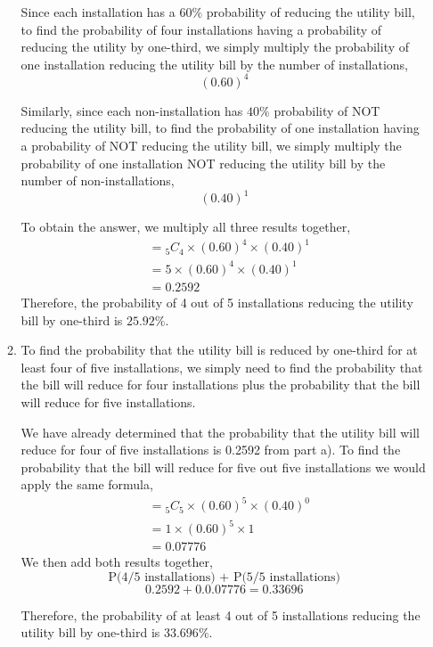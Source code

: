 \documentclass[12pt]{book}
\begin{document}
\begin{enumerate}
\begin{enumerate}
        Since each installation has a $60\%$ probability of reducing the utility bill, to find the probability of four installations having a probability of reducing the utility by one-third, we simply multiply the probability of one installation reducing the utility bill by the number of installations,
        $$(0.60)^4$$
        
        Similarly, since each non-installation has $40\%$ probability of NOT reducing the utility bill, to find the probability of one installation having a probability of NOT reducing the utility bill, we simply multiply the probability of one installation NOT reducing the utility bill by the number of non-installations,
        $$(0.40)^1$$
        
        To obtain the answer, we multiply all three results together,
        \begin{align*}
            &= {}_{5} C_{4} \times (0.60)^4 \times (0.40)^1 \\
            &= 5 \times (0.60)^4 \times (0.40)^1 \\
            &= 0.2592
        \end{align*}
        Therefore, the probability of 4 out of 5 installations reducing the utility bill by one-third is $25.92\%$.
        
        \item To find the probability that the utility bill is reduced by one-third for at least four of five installations, we simply need to find the probability that the bill will reduce for four installations plus the probability that the bill will reduce for five installations.
        
        We have already determined that the probability that the utility bill will reduce for four of five installations is 0.2592 from part a). To find the probability that the bill will reduce for five out five installations we would apply the same formula,
        \begin{align*}
            &= {}_{5} C_{5} \times (0.60)^5 \times (0.40)^0 \\
            &= 1 \times (0.60)^5 \times 1 \\
            &= 0.07776
        \end{align*}
        We then add both results together,
        $$\text{P(4/5 installations) + P(5/5 installations)}$$
        $$0.2592 + 0.0.07776 = 0.33696$$
        
        Therefore, the probability of at least 4 out of 5 installations reducing the utility bill by one-third is $33.696\%$.
        

\end{enumerate}
\end{enumerate}
\end{document}
